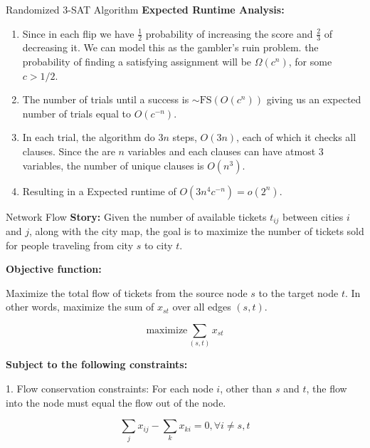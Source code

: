 \documentclass[10pt,a4paper]{article}
\begin{document}
\begin{multicols}{3}
\begin{textbox}{Randomized 3-SAT Algorithm}
        {\bf Expected Runtime Analysis:}
        \begin{enumerate}
            \item Since in each flip we have $\frac{1}{2}$ probability of increasing
                  the score and $\frac{2}{3}$ of decreasing it. We can model this as the gambler's ruin problem.
                  the probability of finding a satisfying assignment will be $\Omega(c^n)$,
                  for some $c > 1/2$.
            \item The number of trials until a success is $\sim \text{FS}(O(c^n))$
                  giving us an expected number of trials equal to $O(c^{-n})$.
            \item In each trial, the algorithm do $3n$ steps, $O(3n)$, each of which
                  it checks all clauses. Since the are $n$ variables and each clauses can
                  have atmost $3$ variables, the number of unique clauses is $O(n^3)$.
            \item Resulting in a Expected runtime of $O(3n^4 c^{-n}) = o(2^{n})$.

        \end{enumerate}
    \end{textbox}

    \begin{textbox}{Network Flow}
        {\bf Story:} Given the number of available tickets $t_{ij}$ between cities
        $i$ and $j$, along with the city map, the goal is to maximize the number of
        tickets sold for people traveling from city $s$ to city $t$.

        \textbf{Objective function:}

        Maximize the total flow of tickets from the source node $s$ to the target node $t$. In other words, maximize the sum of $x_{st}$ over all edges $(s, t)$.

        \begin{equation}
            \text{maximize} \sum_{(s, t)} x_{st}
        \end{equation}

        \textbf{Subject to the following constraints:}

        1. Flow conservation constraints: For each node $i$, other than $s$ and $t$, the flow into the node must equal the flow out of the node.

        \begin{equation}
            \sum_{j} x_{ij} - \sum_{k} x_{ki} = 0, \forall i \neq s, t
        \end{equation}


\end{textbox}
\end{multicols}
\end{document}
